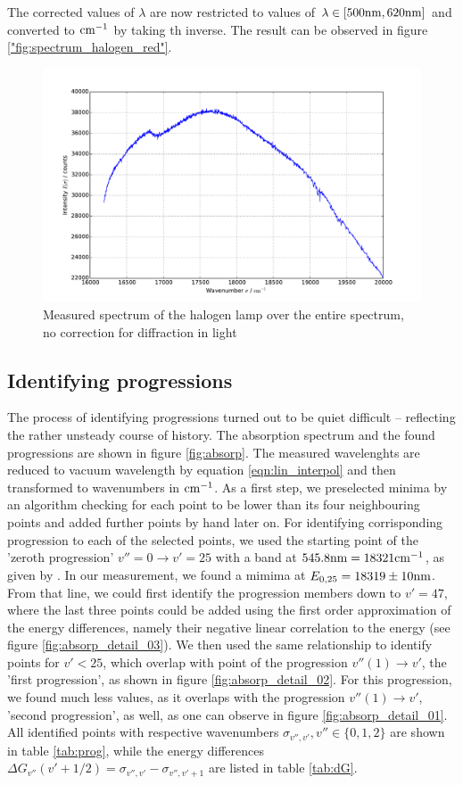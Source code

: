 The corrected values of $\lambda$ are now restricted to values of 
$\lambda \in [500\mathrm{nm}, 620\mathrm{nm}]$ and converted to $\mathrm{cm^{-1}}$ by taking th inverse. The result 
can be observed in figure \ref{"fig:spectrum_halogen_red"}.
\begin{figure}
\centering
\includegraphics[width=\pltw]{analysis/figures/halogen_red.pdf}
\caption{Measured spectrum of the halogen lamp over the entire spectrum, no correction for 
diffraction in light}
\label{fig:spectrum_halogen_red}
\end{figure}


\subsection{Identifying progressions}
The process of identifying progressions turned out to be quiet difficult – reflecting the 
rather unsteady course of history. 
The absorption spectrum and the found progressions are shown in figure \ref{fig:absorp}.
The measured wavelenghts are reduced to vacuum wavelength by equation \eqref{eqn:lin_interpol} 
and then transformed to wavenumbers in $\mathrm{cm^{-1}}$. 
As a first step, we preselected minima by an algorithm checking for each point to be lower than 
its four neighbouring points and added further points by hand later on. For identifying corrisponding 
progression to each of the selected points, we used the starting point of the 'zeroth progression' 
$v'' = 0  \rightarrow v' = 25$ with a band at $545.8 \mathrm{nm} = 18321 \mathrm{cm^{-1}}$, as given by \cite{}. In our 
measurement, we found a mimima at $E_{0, 25} = 18319 \pm 10\mathrm{nm}$. From that line, we could first 
identify the progression members down to $v' = 47$, where the last three points could be added using 
the first order approximation of the energy differences, namely their negative linear correlation 
to the energy (see figure \ref{fig:absorp_detail_03}). We then used the same relationship to identify 
points for $v' < 25$, which overlap with point of the progression $v''(1) \rightarrow v'$, the 
'first progression', 
as shown in figure \ref{fig:absorp_detail_02}. For this progression, we found much less values, as 
it overlaps with the progression $v''(1) \rightarrow v'$, 'second progression', as well, as one can 
observe in figure \ref{fig:absorp_detail_01}. All identified points with respective wavenumbers 
$\sigma_{v'', v'}, v'' \in \{0, 1, 2\}$ are shown in table \ref{tab:prog}, 
while the energy differences $\Delta G_{v''}(v' + 1 / 2) = \sigma_{v'', v'} - \sigma_{v'', v' + 1}$ are 
listed in table \ref{tab:dG}.

